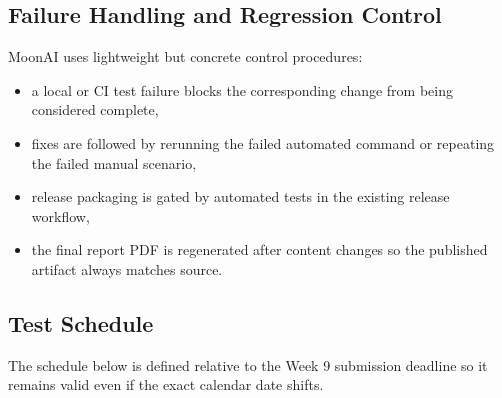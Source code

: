 \subsection{Failure Handling and Regression Control}

MoonAI uses lightweight but concrete control procedures:

\begin{itemize}[nosep]
	\item a local or CI test failure blocks the corresponding change from being considered complete,
	\item fixes are followed by rerunning the failed automated command or repeating the failed manual scenario,
	\item release packaging is gated by automated tests in the existing release workflow,
	\item the final report PDF is regenerated after content changes so the published artifact always matches source.
\end{itemize}

\subsection{Test Schedule}

The schedule below is defined relative to the Week 9 submission deadline so it remains valid
even if the exact calendar date shifts.

